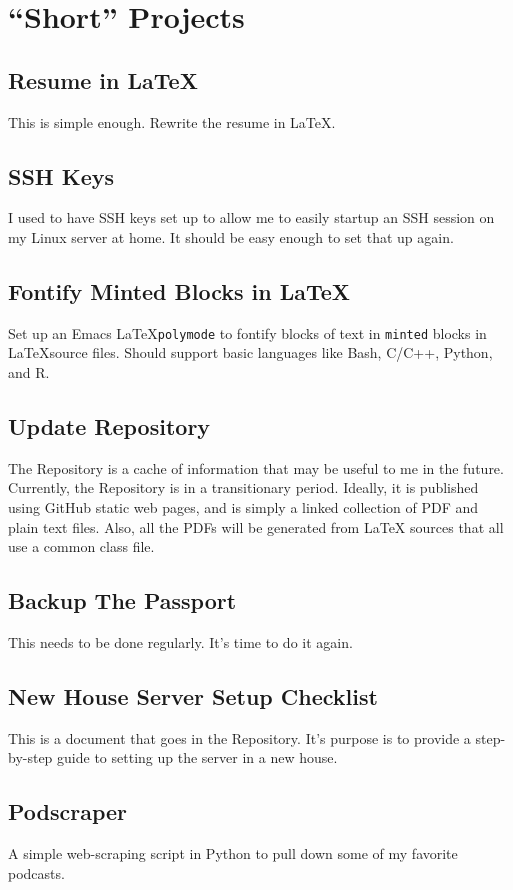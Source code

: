 \documentclass[format.tex]{subfiles}
\begin{document}
\section*{``Short'' Projects}
\subsection*{Resume in \LaTeX}
This is simple enough. Rewrite the resume in \LaTeX.

\subsection*{SSH Keys}
I used to have SSH keys set up to allow me to easily startup an SSH session on
my Linux server at home. It should be easy enough to set that up again.

\subsection*{Fontify Minted Blocks in \LaTeX}
Set up an Emacs \LaTeX \texttt{polymode} to fontify blocks of text in
\texttt{minted} blocks in \LaTeX source files. Should support basic languages
like Bash, C/C++, Python, and R.

\subsection*{Update Repository}
The Repository is a cache of information that may be useful to me in the
future. Currently, the Repository is in a transitionary period. Ideally, it is
published using GitHub static web pages, and is simply a linked collection of
PDF and plain text files. Also, all the PDFs will be generated from \LaTeX
sources that all use a common class file.

\subsection*{Backup The Passport}
This needs to be done regularly. It's time to do it again.

\subsection*{New House Server Setup Checklist}
This is a document that goes in the Repository. It's purpose is to provide a
step-by-step guide to setting up the server in a new house.

\subsection*{Podscraper}
A simple web-scraping script in Python to pull down some of my favorite
podcasts.
\end{document}
